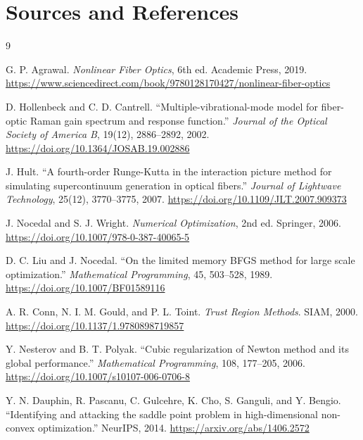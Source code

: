 \documentclass[11pt]{article}
\begin{document}
\section{Sources and References}

\begin{thebibliography}{9}

G. P. Agrawal.
\textit{Nonlinear Fiber Optics}, 6th ed.
Academic Press, 2019.
\url{https://www.sciencedirect.com/book/9780128170427/nonlinear-fiber-optics}

D. Hollenbeck and C. D. Cantrell.
``Multiple-vibrational-mode model for fiber-optic Raman gain spectrum and
response function.''
\textit{Journal of the Optical Society of America B}, 19(12), 2886--2892, 2002.
\url{https://doi.org/10.1364/JOSAB.19.002886}

J. Hult.
``A fourth-order Runge-Kutta in the interaction picture method for simulating
supercontinuum generation in optical fibers.''
\textit{Journal of Lightwave Technology}, 25(12), 3770--3775, 2007.
\url{https://doi.org/10.1109/JLT.2007.909373}

J. Nocedal and S. J. Wright.
\textit{Numerical Optimization}, 2nd ed.
Springer, 2006.
\url{https://doi.org/10.1007/978-0-387-40065-5}

D. C. Liu and J. Nocedal.
``On the limited memory BFGS method for large scale optimization.''
\textit{Mathematical Programming}, 45, 503--528, 1989.
\url{https://doi.org/10.1007/BF01589116}

A. R. Conn, N. I. M. Gould, and P. L. Toint.
\textit{Trust Region Methods}.
SIAM, 2000.
\url{https://doi.org/10.1137/1.9780898719857}

Y. Nesterov and B. T. Polyak.
``Cubic regularization of Newton method and its global performance.''
\textit{Mathematical Programming}, 108, 177--205, 2006.
\url{https://doi.org/10.1007/s10107-006-0706-8}

Y. N. Dauphin, R. Pascanu, C. Gulcehre, K. Cho, S. Ganguli, and Y. Bengio.
``Identifying and attacking the saddle point problem in high-dimensional
non-convex optimization.''
NeurIPS, 2014.
\url{https://arxiv.org/abs/1406.2572}

\end{thebibliography}
\end{document}
